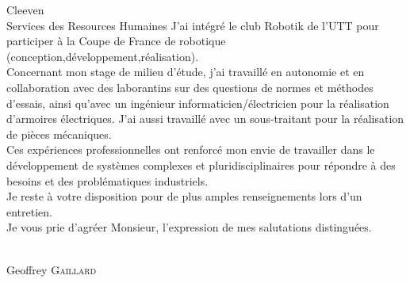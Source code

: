 \documentclass[a4paper,10pt]{scrlttr2}
\begin{document}
\begin{letter}{Cleeven \\ Services des Resources Humaines}
J’ai intégré le club Robotik de l’UTT pour participer à la Coupe de France de robotique (conception,développement,réalisation).\\

Concernant mon stage de milieu d’étude, j’ai travaillé en autonomie et en collaboration avec des laborantins sur des questions de normes et méthodes d’essais, ainsi qu’avec un ingénieur informaticien/électricien pour la réalisation d’armoires électriques. J’ai aussi travaillé avec un sous-traitant pour la réalisation de pièces mécaniques.\\

Ces expériences professionnelles ont renforcé mon envie de travailler dans le développement de systèmes complexes et pluridisciplinaires pour répondre à des besoins et des problématiques industriels.\\

Je reste à votre disposition pour de plus amples renseignements lors d’un entretien.\\
Je vous prie d’agréer Monsieur, l’expression de mes salutations distinguées.

\begin{flushright}
\\[6ex] Geoffrey \textsc{Gaillard}
\end{flushright}

\end{letter}
\end{document}
